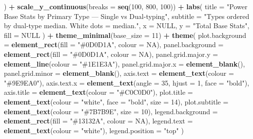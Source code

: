 \documentclass[
]{article}
\newenvironment{Shaded}{\begin{snugshade}}{\end{snugshade}}
\newcommand{\AttributeTok}[1]{\textcolor[rgb]{0.13,0.29,0.53}{#1}}
\newcommand{\ConstantTok}[1]{\textcolor[rgb]{0.56,0.35,0.01}{#1}}
\newcommand{\DecValTok}[1]{\textcolor[rgb]{0.00,0.00,0.81}{#1}}
\newcommand{\FunctionTok}[1]{\textcolor[rgb]{0.13,0.29,0.53}{\textbf{#1}}}
\newcommand{\NormalTok}[1]{#1}
\newcommand{\SpecialCharTok}[1]{\textcolor[rgb]{0.81,0.36,0.00}{\textbf{#1}}}
\newcommand{\StringTok}[1]{\textcolor[rgb]{0.31,0.60,0.02}{#1}}
\begin{document}
\begin{Shaded}
\begin{Highlighting}[]
\NormalTok{  ) }\SpecialCharTok{+}
  \FunctionTok{scale\_y\_continuous}\NormalTok{(}\AttributeTok{breaks =} \FunctionTok{seq}\NormalTok{(}\DecValTok{100}\NormalTok{, }\DecValTok{800}\NormalTok{, }\DecValTok{100}\NormalTok{)) }\SpecialCharTok{+}
  \FunctionTok{labs}\NormalTok{(}
    \AttributeTok{title    =} \StringTok{"Power Base Stats by Primary Type — Single vs Dual{-}typing"}\NormalTok{,}
    \AttributeTok{subtitle =} \StringTok{"Types ordered by dual{-}type median. White dots = median."}\NormalTok{,}
    \AttributeTok{x =} \ConstantTok{NULL}\NormalTok{, }\AttributeTok{y =} \StringTok{"Total Base Stats"}\NormalTok{, }\AttributeTok{fill =} \ConstantTok{NULL}
\NormalTok{  ) }\SpecialCharTok{+}
  \FunctionTok{theme\_minimal}\NormalTok{(}\AttributeTok{base\_size =} \DecValTok{11}\NormalTok{) }\SpecialCharTok{+}
  \FunctionTok{theme}\NormalTok{(}
    \AttributeTok{plot.background  =} \FunctionTok{element\_rect}\NormalTok{(}\AttributeTok{fill =} \StringTok{"\#0D0D1A"}\NormalTok{, }\AttributeTok{colour =} \ConstantTok{NA}\NormalTok{),}
    \AttributeTok{panel.background =} \FunctionTok{element\_rect}\NormalTok{(}\AttributeTok{fill =} \StringTok{"\#0D0D1A"}\NormalTok{, }\AttributeTok{colour =} \ConstantTok{NA}\NormalTok{),}
    \AttributeTok{panel.grid.major.y =} \FunctionTok{element\_line}\NormalTok{(}\AttributeTok{colour =} \StringTok{"\#1E1E3A"}\NormalTok{),}
    \AttributeTok{panel.grid.major.x =} \FunctionTok{element\_blank}\NormalTok{(),}
    \AttributeTok{panel.grid.minor   =} \FunctionTok{element\_blank}\NormalTok{(),}
    \AttributeTok{axis.text   =} \FunctionTok{element\_text}\NormalTok{(}\AttributeTok{colour =} \StringTok{"\#9E9EA0"}\NormalTok{),}
    \AttributeTok{axis.text.x =} \FunctionTok{element\_text}\NormalTok{(}\AttributeTok{angle =} \DecValTok{35}\NormalTok{, }\AttributeTok{hjust =} \DecValTok{1}\NormalTok{, }\AttributeTok{face =} \StringTok{"bold"}\NormalTok{),}
    \AttributeTok{axis.title  =} \FunctionTok{element\_text}\NormalTok{(}\AttributeTok{colour =} \StringTok{"\#C0C0D0"}\NormalTok{),}
    \AttributeTok{plot.title    =} \FunctionTok{element\_text}\NormalTok{(}\AttributeTok{colour =} \StringTok{"white"}\NormalTok{, }\AttributeTok{face =} \StringTok{"bold"}\NormalTok{, }\AttributeTok{size =} \DecValTok{14}\NormalTok{),}
    \AttributeTok{plot.subtitle =} \FunctionTok{element\_text}\NormalTok{(}\AttributeTok{colour =} \StringTok{"\#7B7B9E"}\NormalTok{, }\AttributeTok{size =} \DecValTok{10}\NormalTok{),}
    \AttributeTok{legend.background =} \FunctionTok{element\_rect}\NormalTok{(}\AttributeTok{fill =} \StringTok{"\#13132A"}\NormalTok{, }\AttributeTok{colour =} \ConstantTok{NA}\NormalTok{),}
    \AttributeTok{legend.text  =} \FunctionTok{element\_text}\NormalTok{(}\AttributeTok{colour =} \StringTok{"white"}\NormalTok{),}
    \AttributeTok{legend.position =} \StringTok{"top"}
\NormalTok{  )}
\end{Highlighting}
\end{Shaded}
\end{document}
